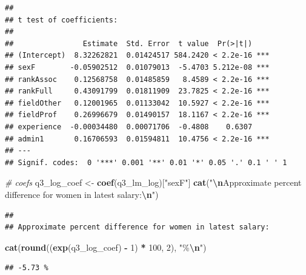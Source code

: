 \documentclass[
]{article}
\newenvironment{Shaded}{\begin{snugshade}}{\end{snugshade}}
\newcommand{\CommentTok}[1]{\textcolor[rgb]{0.56,0.35,0.01}{\textit{#1}}}
\newcommand{\DecValTok}[1]{\textcolor[rgb]{0.00,0.00,0.81}{#1}}
\newcommand{\FunctionTok}[1]{\textcolor[rgb]{0.13,0.29,0.53}{\textbf{#1}}}
\newcommand{\NormalTok}[1]{#1}
\newcommand{\OtherTok}[1]{\textcolor[rgb]{0.56,0.35,0.01}{#1}}
\newcommand{\SpecialCharTok}[1]{\textcolor[rgb]{0.81,0.36,0.00}{\textbf{#1}}}
\newcommand{\StringTok}[1]{\textcolor[rgb]{0.31,0.60,0.02}{#1}}
\begin{document}
\begin{verbatim}
## 
## t test of coefficients:
## 
##                Estimate  Std. Error  t value  Pr(>|t|)    
## (Intercept)  8.32262821  0.01424517 584.2420 < 2.2e-16 ***
## sexF        -0.05902512  0.01079013  -5.4703 5.212e-08 ***
## rankAssoc    0.12568758  0.01485859   8.4589 < 2.2e-16 ***
## rankFull     0.43091799  0.01811909  23.7825 < 2.2e-16 ***
## fieldOther   0.12001965  0.01133042  10.5927 < 2.2e-16 ***
## fieldProf    0.26996679  0.01490157  18.1167 < 2.2e-16 ***
## experience  -0.00034480  0.00071706  -0.4808    0.6307    
## admin1       0.16706593  0.01594811  10.4756 < 2.2e-16 ***
## ---
## Signif. codes:  0 '***' 0.001 '**' 0.01 '*' 0.05 '.' 0.1 ' ' 1
\end{verbatim}

\begin{Shaded}
\begin{Highlighting}[]
\CommentTok{\# coefs}
\NormalTok{q3\_log\_coef }\OtherTok{\textless{}{-}} \FunctionTok{coef}\NormalTok{(q3\_lm\_log)[}\StringTok{"sexF"}\NormalTok{]}
\FunctionTok{cat}\NormalTok{(}\StringTok{"}\SpecialCharTok{\textbackslash{}n}\StringTok{Approximate percent difference for women in latest salary:}\SpecialCharTok{\textbackslash{}n}\StringTok{"}\NormalTok{)}
\end{Highlighting}
\end{Shaded}

\begin{verbatim}
## 
## Approximate percent difference for women in latest salary:
\end{verbatim}

\begin{Shaded}
\begin{Highlighting}[]
\FunctionTok{cat}\NormalTok{(}\FunctionTok{round}\NormalTok{((}\FunctionTok{exp}\NormalTok{(q3\_log\_coef) }\SpecialCharTok{{-}} \DecValTok{1}\NormalTok{) }\SpecialCharTok{*} \DecValTok{100}\NormalTok{, }\DecValTok{2}\NormalTok{), }\StringTok{"\%}\SpecialCharTok{\textbackslash{}n}\StringTok{"}\NormalTok{)}
\end{Highlighting}
\end{Shaded}

\begin{verbatim}
## -5.73 %
\end{verbatim}
\end{document}
